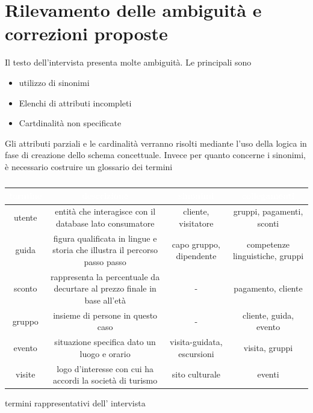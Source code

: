 \documentclass[a4paper,12pt]{report}
\begin{document}
\section{Rilevamento delle ambiguità e correzioni proposte}
Il testo dell'intervista presenta molte ambiguità. Le principali sono
\begin{itemize}
    \item utilizzo di sinonimi
    \item Elenchi di attributi incompleti
    \item Cartdinalità non specificate
\end{itemize}

Gli attributi parziali e le cardinalità verranno risolti mediante l'uso della logica in fase di creazione dello schema concettuale.
Invece per quanto concerne i sinonimi, è necessario costruire un glossario dei termini


\begin{table}[H]
    \begin{center}
        \begin{tabularx}{\textwidth}{|C|C|C|C|}
            \hline
             \textcolor{white}{termine} & \textcolor{white}{descrizione}                                             & \textcolor{white}{sinonimi} & \textcolor{white}{collegamenti} \\
            \hline
            utente                                    & entità che interagisce con il database lato consumatore                    & cliente, visitatore         & gruppi, pagamenti, sconti       \\
            \hline
            guida                                     & figura qualificata in lingue e storia che illustra il percorso passo passo & capo gruppo, dipendente     & competenze linguistiche, gruppi \\
            \hline
            sconto                                    & rappresenta la percentuale da decurtare al prezzo finale in base all'età   & -                           & pagamento, cliente              \\
            \hline
            gruppo                                    & insieme di persone in questo caso                                          & -                           & cliente, guida, evento          \\
            \hline
            evento                                    & situazione specifica dato un luogo e orario                                & visita-guidata, escursioni  & visita, gruppi                  \\
            \hline
            visite                                    & logo d'interesse con cui ha accordi la società di turismo                  & sito culturale              & eventi                          \\
            \hline
        \end{tabularx}
        \caption{\label{glossario:termini}} termini rappresentativi dell' intervista
    \end{center}
\end{table}
\end{document}
